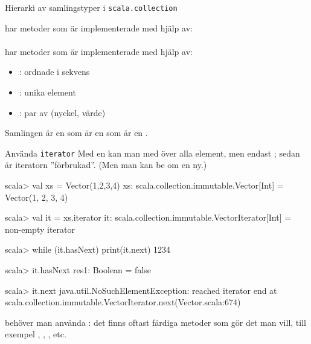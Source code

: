 \begin{Slide}{Hierarki av samlingstyper i \texttt{scala.collection}}

\begin{multicols}{2}

\columnbreak
 
{\SlideFontTiny 

 har metoder som är implementerade med hjälp av: \\
\\

\vspace{1em} har metoder som är implementerade med hjälp av: \\

}

\begin{itemize}\SlideFontTiny 
\item[] : ordnade i sekvens
\item[] : unika element
\item[] : par av (nyckel, värde)
\end{itemize}


\end{multicols}

{\SlideFontSmall Samlingen  är en  som är en  som är en .}
\end{Slide}

\begin{Slide}{Använda \texttt{iterator}}\SlideFontSmall
Med en  kan man  med  över alla element, men endast ; sedan är iteratorn ''förbrukad''. (Men man kan be om en ny.)
\begin{REPL}
scala> val xs = Vector(1,2,3,4)
xs: scala.collection.immutable.Vector[Int] = Vector(1, 2, 3, 4)

scala> val it = xs.iterator
it: scala.collection.immutable.VectorIterator[Int] = non-empty iterator

scala> while (it.hasNext) print(it.next)
1234

scala> it.hasNext
res1: Boolean = false

scala> it.next
java.util.NoSuchElementException: reached iterator end
  at scala.collection.immutable.VectorIterator.next(Vector.scala:674)
\end{REPL}
 behöver man  använda : det finns oftast färdiga metoder som gör det man vill, till exempel , , ,  etc.
\end{Slide}

